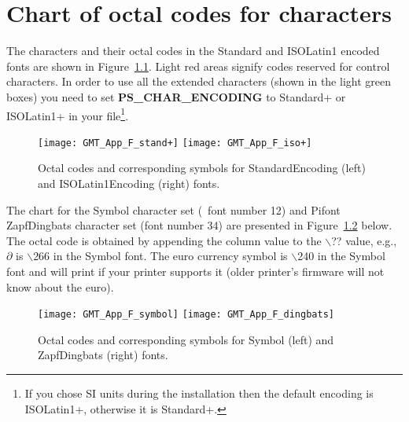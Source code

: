 %
%
\chapter{Chart of octal codes for characters}
\label{app:F}
\thispagestyle{headings}

The characters and their octal codes in the Standard and ISOLatin1 encoded fonts
are shown in Figure~\ref{fig:GMT_App_F_text}.  Light red areas signify codes reserved for
control characters.  In order to use all the extended characters (shown in the light green boxes) you need to
set \textbf{PS\_CHAR\_ENCODING} to Standard+ or ISOLatin1+ in your  file\footnote{If you chose
SI units during the installation then the default encoding is ISOLatin1+, otherwise it is Standard+.}.

\begin{figure}[h]
   \texttt{[image: GMT\_App\_F\_stand+]}\hfill
   \texttt{[image: GMT\_App\_F\_iso+]}
   \caption{Octal codes and corresponding symbols for StandardEncoding (left)
   and ISOLatin1Encoding (right) fonts.}
   \label{fig:GMT_App_F_text}
\end{figure}

\clearpage


The chart for the Symbol character set (\GMT\ font number 12) and Pifont ZapfDingbats character set
(font number 34)
are presented in Figure~\ref{fig:GMT_App_F_symbol} below. The octal code is obtained by appending the
column value to the $\backslash$?? value, e.g., $\partial$ is
$\backslash$266 in the Symbol font.  The euro currency symbol is $\backslash$240 in the Symbol font and will
print if your printer supports it (older printer's firmware will not know about the euro).

\begin{figure}[h]
   \texttt{[image: GMT\_App\_F\_symbol]}\hfill
   \texttt{[image: GMT\_App\_F\_dingbats]}
   \caption{Octal codes and corresponding symbols for Symbol (left)
   and ZapfDingbats (right) fonts.}
   \label{fig:GMT_App_F_symbol}
\end{figure}
